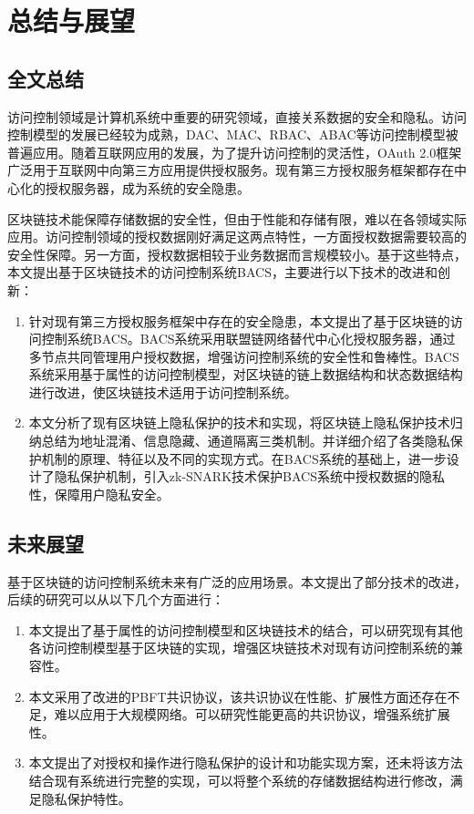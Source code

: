 
\chapter{总结与展望}

\section{全文总结}

访问控制领域是计算机系统中重要的研究领域，直接关系数据的安全和隐私。访问控制模型的发展已经较为成熟，DAC、MAC、RBAC、ABAC等访问控制模型被普遍应用。随着互联网应用的发展，为了提升访问控制的灵活性，OAuth 2.0框架广泛用于互联网中向第三方应用提供授权服务。现有第三方授权服务框架都存在中心化的授权服务器，成为系统的安全隐患。

区块链技术能保障存储数据的安全性，但由于性能和存储有限，难以在各领域实际应用。访问控制领域的授权数据刚好满足这两点特性，一方面授权数据需要较高的安全性保障。另一方面，授权数据相较于业务数据而言规模较小。基于这些特点，本文提出基于区块链技术的访问控制系统BACS，主要进行以下技术的改进和创新：

\begin{enumerate}
	\item 针对现有第三方授权服务框架中存在的安全隐患，本文提出了基于区块链的访问控制系统BACS。BACS系统采用联盟链网络替代中心化授权服务器，通过多节点共同管理用户授权数据，增强访问控制系统的安全性和鲁棒性。BACS系统采用基于属性的访问控制模型，对区块链的链上数据结构和状态数据结构进行改进，使区块链技术适用于访问控制系统。
	\item 本文分析了现有区块链上隐私保护的技术和实现，将区块链上隐私保护技术归纳总结为地址混淆、信息隐藏、通道隔离三类机制。并详细介绍了各类隐私保护机制的原理、特征以及不同的实现方式。在BACS系统的基础上，进一步设计了隐私保护机制，引入zk-SNARK技术保护BACS系统中授权数据的隐私性，保障用户隐私安全。
\end{enumerate}

\section{未来展望}

基于区块链的访问控制系统未来有广泛的应用场景。本文提出了部分技术的改进，后续的研究可以从以下几个方面进行：

\begin{enumerate}
	\item 本文提出了基于属性的访问控制模型和区块链技术的结合，可以研究现有其他各访问控制模型基于区块链的实现，增强区块链技术对现有访问控制系统的兼容性。
	\item 本文采用了改进的PBFT共识协议，该共识协议在性能、扩展性方面还存在不足，难以应用于大规模网络。可以研究性能更高的共识协议，增强系统扩展性。
	\item 本文提出了对授权和操作进行隐私保护的设计和功能实现方案，还未将该方法结合现有系统进行完整的实现，可以将整个系统的存储数据结构进行修改，满足隐私保护特性。
\end{enumerate}